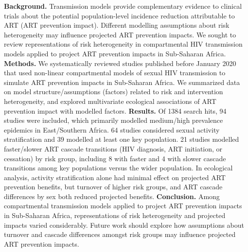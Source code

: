 \textbf{Background.}
Transmission models provide complementary evidence to clinical trials about
the potential population-level incidence reduction attributable to ART (ART prevention impact).
Different modelling assumptions about risk heterogeneity may influence projected ART prevention impacts.
We sought to review representations of risk heterogeneity in compartmental HIV transmission models
applied to project ART prevention impacts in Sub-Saharan Africa.
\textbf{Methods.}
We systematically reviewed studies published before January 2020 that used
non-linear compartmental models of sexual HIV transmission
to simulate ART prevention impacts in Sub-Saharan Africa.
We summarized data on model structure/assumptions (factors) related to risk and intervention heterogeneity,
and explored multivariate ecological associations of ART prevention impact with modelled factors.
\textbf{Results.}
Of 1384 search hits, 94 studies were included,
which primarily modelled medium/high prevalence epidemics in East/Southern Africa.
64 studies considered sexual activity stratification and 39 modelled at least one key population.
21 studies modelled faster/slower ART cascade transitions (HIV diagnosis, ART initiation, or cessation) by risk group,
including 8 with faster and 4 with slower cascade transitions among key populations versus the wider population.
In ecological analysis, activity stratification alone had minimal effect on projected ART prevention benefits,
but turnover of higher risk groups, and ART cascade differences by sex both reduced projected benefits.
\textbf{Conclusion.}
Among compartmental transmission models applied to project ART prevention impacts in Sub-Saharan Africa,
representations of risk heterogeneity and projected impacts varied considerably.
Future work should explore how assumptions about
turnover and cascade differences amongst risk groups
may influence projected ART prevention impacts.